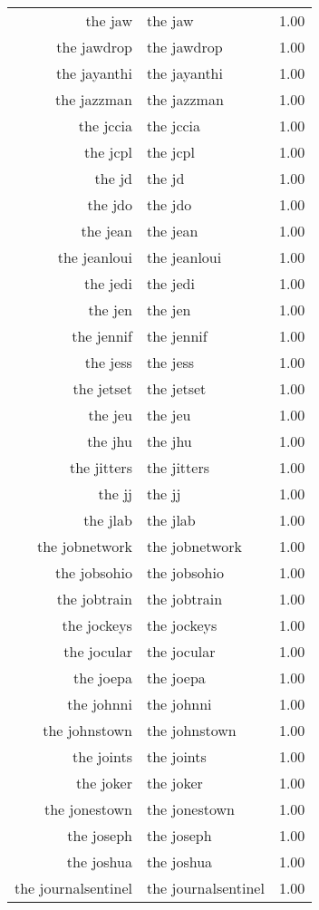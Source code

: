 \begin{table}[ht]
\begin{tabular}{rlr}
  the jaw & the jaw & 1.00 \\ 
  the jawdrop & the jawdrop & 1.00 \\ 
  the jayanthi & the jayanthi & 1.00 \\ 
  the jazzman & the jazzman & 1.00 \\ 
  the jccia & the jccia & 1.00 \\ 
  the jcpl & the jcpl & 1.00 \\ 
  the jd & the jd & 1.00 \\ 
  the jdo & the jdo & 1.00 \\ 
  the jean & the jean & 1.00 \\ 
  the jeanloui & the jeanloui & 1.00 \\ 
  the jedi & the jedi & 1.00 \\ 
  the jen & the jen & 1.00 \\ 
  the jennif & the jennif & 1.00 \\ 
  the jess & the jess & 1.00 \\ 
  the jetset & the jetset & 1.00 \\ 
  the jeu & the jeu & 1.00 \\ 
  the jhu & the jhu & 1.00 \\ 
  the jitters & the jitters & 1.00 \\ 
  the jj & the jj & 1.00 \\ 
  the jlab & the jlab & 1.00 \\ 
  the jobnetwork & the jobnetwork & 1.00 \\ 
  the jobsohio & the jobsohio & 1.00 \\ 
  the jobtrain & the jobtrain & 1.00 \\ 
  the jockeys & the jockeys & 1.00 \\ 
  the jocular & the jocular & 1.00 \\ 
  the joepa & the joepa & 1.00 \\ 
  the johnni & the johnni & 1.00 \\ 
  the johnstown & the johnstown & 1.00 \\ 
  the joints & the joints & 1.00 \\ 
  the joker & the joker & 1.00 \\ 
  the jonestown & the jonestown & 1.00 \\ 
  the joseph & the joseph & 1.00 \\ 
  the joshua & the joshua & 1.00 \\ 
  the journalsentinel & the journalsentinel & 1.00 \\ 

\end{tabular}
\end{table}
